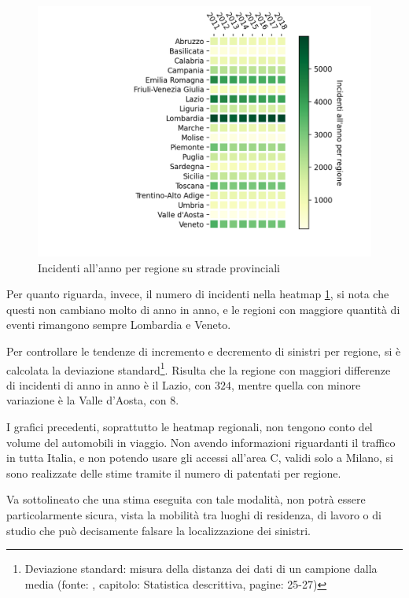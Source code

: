 \documentclass[a4paper,12pt]{report}
\begin{document}
\begin{figure}
    \includegraphics[width=\linewidth]{../src/incidenti/incidenti_aci/mappe_regioni/regioni_heatmap.png}
    \caption{Incidenti all'anno per regione su strade provinciali}
    \label{fig:regione-heatmap}
\end{figure}

Per quanto riguarda, invece, il numero di incidenti 
nella heatmap \ref{fig:regione-heatmap}, 
si nota che questi non cambiano molto di anno in anno, e le regioni con maggiore quantità 
di eventi rimangono sempre Lombardia e Veneto. 

Per controllare le tendenze di incremento e decremento di sinistri per regione, 
si è calcolata la deviazione standard\footnote{Deviazione standard: 
misura della distanza dei dati di un campione dalla media 
(fonte: \cite{PROB_E_STATISTICA:1}, 
capitolo: Statistica descrittiva, pagine: 25-27)}. 
Risulta che la regione con maggiori differenze di incidenti di anno in anno 
è il Lazio, con $324$, mentre quella con minore 
variazione è la Valle d'Aosta, con $8$. 

I grafici precedenti, soprattutto le heatmap regionali, non tengono conto del 
volume del automobili in viaggio. 
Non avendo informazioni riguardanti il traffico in tutta Italia, 
e non potendo usare gli accessi all'area C, validi solo a Milano, si sono realizzate 
delle stime tramite il numero di patentati per regione. 

Va sottolineato che una stima eseguita con tale modalità, 
non potrà essere particolarmente 
sicura, vista la mobilità tra luoghi di residenza, di 
lavoro o di studio che può decisamente falsare la localizzazione dei sinistri.
\end{document}

